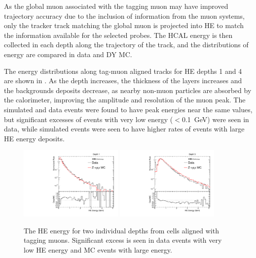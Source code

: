 As the global muon associated with the tagging muon may have improved trajectory accuracy due to the inclusion of information from the muon systems, only the tracker track matching the global muon is projected into HE to match the information available for the selected probes.
The HCAL energy is then collected in each depth along the trajectory of the track, and the distributions of energy are compared in data and DY MC.

The energy distributions along tag-muon aligned tracks for HE depths 1 and 4 are shown in .
As the depth increases, the thickness of the layers increases and the backgrounds deposits decrease, as nearby non-muon particles are absorbed by the calorimeter, improving the amplitude and resolution of the muon peak.
The simulated and data events were found to have peak energies near the same values, but significant excesses of events with very low energy ($<$\SI{0.1}{\giga\eV}) were seen in data, while simulated events were seen to have higher rates of events with large HE energy deposits.

\begin{figure}[htbp]
	\centering
	\includegraphics[width=0.45\textwidth]{figures/hcalAllE_depth0.pdf}
        \hspace{0.01\textwidth}
        \includegraphics[width=0.45\textwidth]{figures/hcalAllE_depth4.pdf}
        \caption[HE Energy Deposits Along Tag-Aligned Muons]{The HE energy for two individual depths from cells aligned with tagging muons. Significant excess is seen in data events with very low HE energy and MC events with large energy.}
        \label{fig:unCorrHEDepths}
\end{figure}

